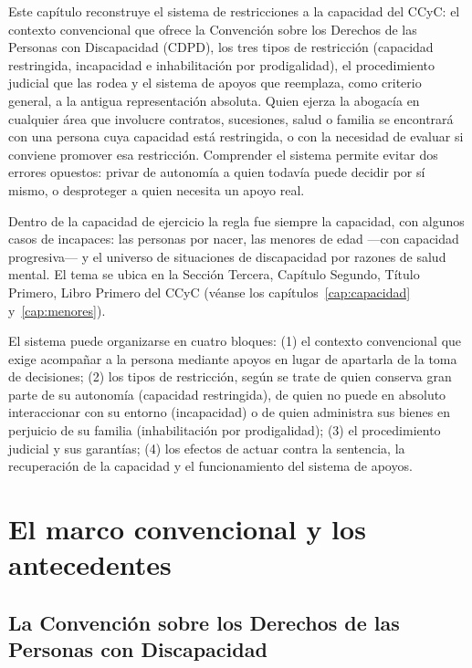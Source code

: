 \documentclass[12pt,oneside]{book}
\begin{document}
Este capítulo reconstruye el sistema de restricciones a la capacidad del CCyC: el contexto convencional que ofrece la Convención sobre los Derechos de las Personas con Discapacidad (CDPD), los tres tipos de restricción (capacidad restringida, incapacidad e inhabilitación por prodigalidad), el procedimiento judicial que las rodea y el sistema de apoyos que reemplaza, como criterio general, a la antigua representación absoluta. Quien ejerza la abogacía en cualquier área que involucre contratos, sucesiones, salud o familia se encontrará con una persona cuya capacidad está restringida, o con la necesidad de evaluar si conviene promover esa restricción. Comprender el sistema permite evitar dos errores opuestos: privar de autonomía a quien todavía puede decidir por sí mismo, o desproteger a quien necesita un apoyo real.

Dentro de la capacidad de ejercicio la regla fue siempre la capacidad, con algunos casos de incapaces: las personas por nacer, las menores de edad ---con capacidad progresiva--- y el universo de situaciones de discapacidad por razones de salud mental. El tema se ubica en la Sección Tercera, Capítulo Segundo, Título Primero, Libro Primero del CCyC (véanse los capítulos~\ref{cap:capacidad} y~\ref{cap:menores}).

\begin{nota}
El sistema puede organizarse en cuatro bloques: (1) el contexto convencional que exige acompañar a la persona mediante apoyos en lugar de apartarla de la toma de decisiones; (2) los tipos de restricción, según se trate de quien conserva gran parte de su autonomía (capacidad restringida), de quien no puede en absoluto interaccionar con su entorno (incapacidad) o de quien administra sus bienes en perjuicio de su familia (inhabilitación por prodigalidad); (3) el procedimiento judicial y sus garantías; (4) los efectos de actuar contra la sentencia, la recuperación de la capacidad y el funcionamiento del sistema de apoyos.
\end{nota}

\section{El marco convencional y los antecedentes}

\subsection{La Convención sobre los Derechos de las Personas con Discapacidad}
\end{document}
